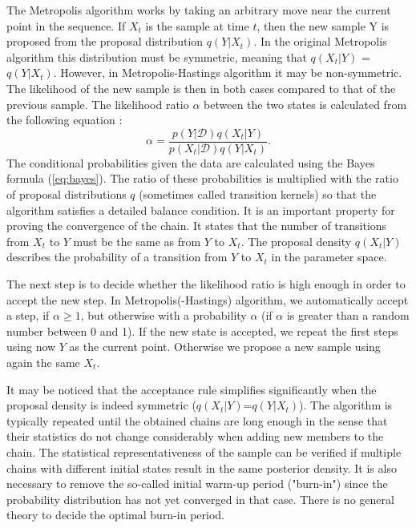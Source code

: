 \documentclass{wihuri}
\def\be{\begin{equation}}
\def\ee{\end{equation}}
\begin{document}
The Metropolis algorithm works by taking an arbitrary move near the current
point in the sequence. If $X_{t}$ is the sample at time $t$, then the new sample Y is proposed from the proposal distribution $q(Y|X_{t})$. In the original Metropolis algorithm this distribution must be symmetric, meaning that $q(X_{t}|Y)$ = $q(Y|X_{t})$. However, in Metropolis-Hastings algorithm it may be non-symmetric. The likelihood of the new sample is then in both cases compared to that of the previous sample. The likelihood ratio $\alpha$ between the two states is calculated from the following equation \cite{tuomi}:
\be \label{eq:likely_ratio} 
\alpha = \frac{p(Y|\mathcal{D})q(X_{t}|Y)}{p(X_{t}|\mathcal{D})q(Y|X_{t})}.
\ee
The conditional probabilities given the data are calculated using the Bayes formula (\ref{eq:bayes}). The ratio of these probabilities is multiplied with the ratio of proposal distributions $q$ (sometimes called transition kernels) so that the algorithm satisfies a detailed balance condition. It is an important property for proving the convergence of the chain. It states that the number of transitions from $X_{t}$ to $Y$ must be the same as from $Y$ to $X_{t}$.  The proposal density $q(X_{t}|Y)$ describes the probability of a transition from $Y$ to $X_{t}$ in the parameter space.

The next step is to decide whether the likelihood ratio is high enough in order to accept the new step. In Metropolis(-Hastings) algorithm, we automatically accept a step, if $\alpha \ge 1$, but otherwise with a probability $\alpha$ (if $\alpha$ is greater than a random number between 0 and 1). If the new state is accepted, we repeat the first steps using now $Y$ as the current point. Otherwise we propose a new sample using again the same $X_{t}$. 



It may be noticed that the acceptance rule simplifies significantly when the
proposal density is indeed symmetric ($q(X_{t}|Y)$=$q(Y|X_{t})$). The algorithm is typically repeated until the obtained chains are long enough in the sense that their statistics do not change considerably when adding new members to the chain. The statistical representativeness of the sample can be verified
if multiple chains with different initial states result in the same posterior density. It is also necessary to remove the so-called initial warm-up period ("burn-in") %
since the probability distribution has not yet converged in that case. %
There is no general theory to decide the optimal burn-in period.%
\end{document}
